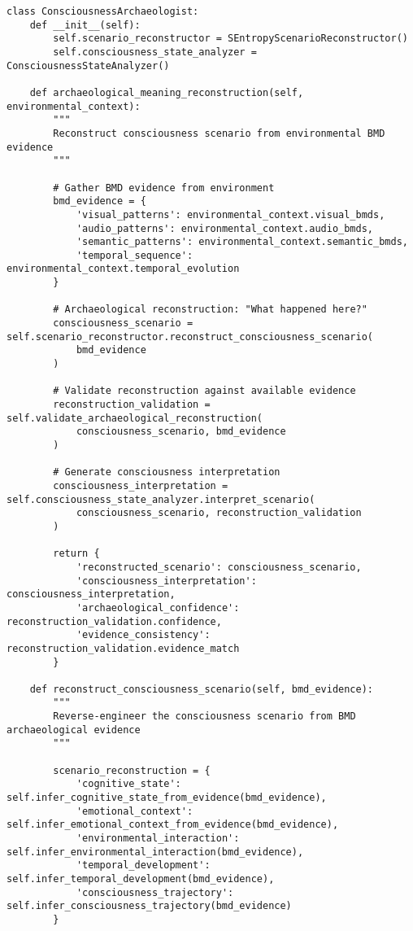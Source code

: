 \documentclass[12pt,a4paper]{article}
\begin{document}
\begin{lstlisting}[style=pythonstyle, caption=Consciousness Archaeology Implementation]
class ConsciousnessArchaeologist:
    def __init__(self):
        self.scenario_reconstructor = SEntropyScenarioReconstructor()
        self.consciousness_state_analyzer = ConsciousnessStateAnalyzer()
        
    def archaeological_meaning_reconstruction(self, environmental_context):
        """
        Reconstruct consciousness scenario from environmental BMD evidence
        """
        
        # Gather BMD evidence from environment
        bmd_evidence = {
            'visual_patterns': environmental_context.visual_bmds,
            'audio_patterns': environmental_context.audio_bmds,
            'semantic_patterns': environmental_context.semantic_bmds,
            'temporal_sequence': environmental_context.temporal_evolution
        }
        
        # Archaeological reconstruction: "What happened here?"
        consciousness_scenario = self.scenario_reconstructor.reconstruct_consciousness_scenario(
            bmd_evidence
        )
        
        # Validate reconstruction against available evidence
        reconstruction_validation = self.validate_archaeological_reconstruction(
            consciousness_scenario, bmd_evidence
        )
        
        # Generate consciousness interpretation
        consciousness_interpretation = self.consciousness_state_analyzer.interpret_scenario(
            consciousness_scenario, reconstruction_validation
        )
        
        return {
            'reconstructed_scenario': consciousness_scenario,
            'consciousness_interpretation': consciousness_interpretation,
            'archaeological_confidence': reconstruction_validation.confidence,
            'evidence_consistency': reconstruction_validation.evidence_match
        }
    
    def reconstruct_consciousness_scenario(self, bmd_evidence):
        """
        Reverse-engineer the consciousness scenario from BMD archaeological evidence
        """
        
        scenario_reconstruction = {
            'cognitive_state': self.infer_cognitive_state_from_evidence(bmd_evidence),
            'emotional_context': self.infer_emotional_context_from_evidence(bmd_evidence),
            'environmental_interaction': self.infer_environmental_interaction(bmd_evidence),
            'temporal_development': self.infer_temporal_development(bmd_evidence),
            'consciousness_trajectory': self.infer_consciousness_trajectory(bmd_evidence)
        }
        

\end{lstlisting}
\end{document}
